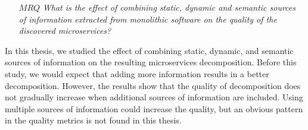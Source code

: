 \begin{itemize}
    \item[$MRQ$] \textit{What is the effect of combining static, dynamic and semantic sources of information extracted from monolithic software on the quality of the discovered microservices?}
\end{itemize}

In this thesis, we studied the effect of combining static, dynamic, and semantic sources of information on the resulting microservices decomposition. Before this study, we would expect that adding more information results in a better decomposition. However, the results show that the quality of decomposition does not gradually increase when additional sources of information are included. Using multiple sources of information could increase the quality, but an obvious pattern in the quality metrics is not found in this thesis. 